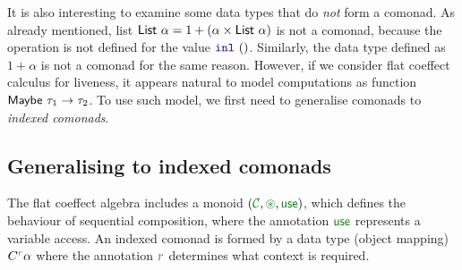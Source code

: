 It is also interesting to examine some data types that do \emph{not} form a comonad. As already
mentioned, list $\ident{List}~\alpha = 1 + (\alpha \times \ident{List}~\alpha)$ is not a comonad,
because the  operation is not defined for the value $\kvd{inl}~()$. Similarly,
the  data type defined as $1 + \alpha$ is not a comonad for the same reason.
However, if we consider flat coeffect calculus for liveness, it appears natural to model computations
as function $\textnormal{\sffamily Maybe}~\tau_1 \rightarrow \tau_2$. To use such model, we first need to 
generalise comonads to \emph{indexed comonads}.


\subsection{Generalising to indexed comonads}
\label{sec:flat-semantics-idx}

The flat coeffect algebra includes a monoid $(\C, \cseq, \cunit)$, which defines the behaviour of
sequential composition, where the annotation $\cunit$ represents a variable access. An indexed 
comonad is formed by a data type (object mapping) $\ctyp{\cclrd{r}}{\alpha}$ where the annotation 
$\cclrd{r}$ determines what context is required. 

